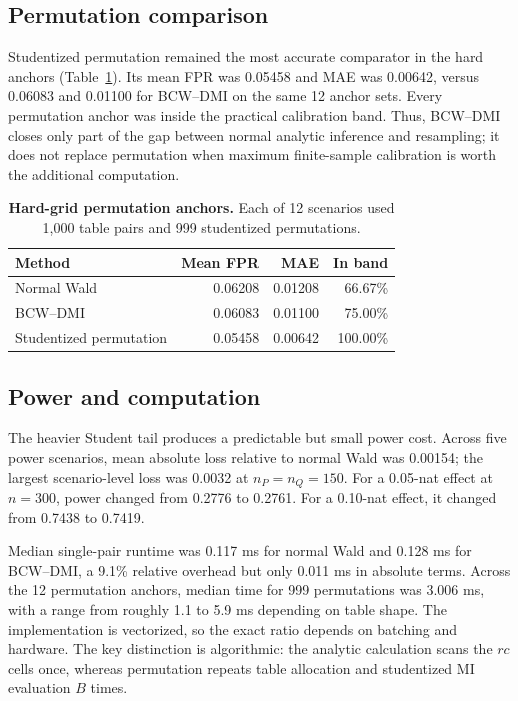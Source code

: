 \documentclass[10pt,twocolumn]{article}
\newcommand{\method}{BCW--DMI}
\begin{document}
\subsection{Permutation comparison}

Studentized permutation remained the most accurate comparator in the hard
anchors (Table~\ref{tab:permutation}). Its mean FPR was 0.05458 and MAE was
0.00642, versus 0.06083 and 0.01100 for \method{} on the same 12 anchor
sets. Every permutation anchor was inside the practical calibration band.
Thus, \method{} closes only part of the gap between normal analytic inference
and resampling; it does not replace permutation when maximum finite-sample
calibration is worth the additional computation.

\begin{table}[t]
\centering
\caption{\textbf{Hard-grid permutation anchors.} Each of 12 scenarios used
1,000 table pairs and 999 studentized permutations.}
\label{tab:permutation}
\small
\setlength{\tabcolsep}{3pt}
\begin{tabular}{@{}lrrr@{}}
\toprule
Method & Mean FPR & MAE & In band\\
\midrule
Normal Wald & 0.06208 & 0.01208 & 66.67\%\\
\method & 0.06083 & 0.01100 & 75.00\%\\
Studentized permutation & 0.05458 & 0.00642 & 100.00\%\\
\bottomrule
\end{tabular}
\end{table}

\subsection{Power and computation}

The heavier Student tail produces a predictable but small power cost.
Across five power scenarios, mean absolute loss relative to normal Wald was
0.00154; the largest scenario-level loss was 0.0032 at \(n_P=n_Q=150\).
For a 0.05-nat effect at \(n=300\), power changed from 0.2776 to 0.2761.
For a 0.10-nat effect, it changed from 0.7438 to 0.7419.

Median single-pair runtime was 0.117 ms for normal Wald and 0.128 ms for
\method, a 9.1\% relative overhead but only 0.011 ms in absolute terms.
Across the 12 permutation anchors, median time for 999 permutations was
3.006 ms, with a range from roughly 1.1 to 5.9 ms depending on table shape.
The implementation is vectorized, so the exact ratio depends on batching and
hardware. The key distinction is algorithmic: the analytic calculation scans
the \(rc\) cells once, whereas permutation repeats table allocation and
studentized MI evaluation \(B\) times.
\end{document}
